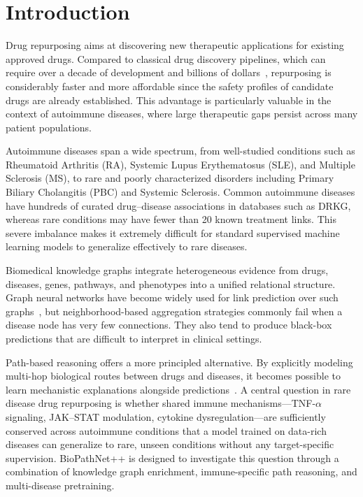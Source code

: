 \documentclass[conference]{IEEEtran}
\begin{document}
\section{Introduction}

Drug repurposing aims at discovering new therapeutic applications for existing approved drugs. Compared to classical drug discovery pipelines, which can require over a decade of development and billions of dollars~\cite{drkg}, repurposing is considerably faster and more affordable since the safety profiles of candidate drugs are already established. This advantage is particularly valuable in the context of autoimmune diseases, where large therapeutic gaps persist across many patient populations.

Autoimmune diseases span a wide spectrum, from well-studied conditions such as Rheumatoid Arthritis (RA), Systemic Lupus Erythematosus (SLE), and Multiple Sclerosis (MS), to rare and poorly characterized disorders including Primary Biliary Cholangitis (PBC) and Systemic Sclerosis. Common autoimmune diseases have hundreds of curated drug--disease associations in databases such as DRKG, whereas rare conditions may have fewer than 20 known treatment links. This severe imbalance makes it extremely difficult for standard supervised machine learning models to generalize effectively to rare diseases.

Biomedical knowledge graphs integrate heterogeneous evidence from drugs, diseases, genes, pathways, and phenotypes into a unified relational structure. Graph neural networks have become widely used for link prediction over such graphs~\cite{distmult}, but neighborhood-based aggregation strategies commonly fail when a disease node has very few connections. They also tend to produce black-box predictions that are difficult to interpret in clinical settings.

Path-based reasoning offers a more principled alternative. By explicitly modeling multi-hop biological routes between drugs and diseases, it becomes possible to learn mechanistic explanations alongside predictions~\cite{nbfnet}. A central question in rare disease drug repurposing is whether shared immune mechanisms---TNF-$\alpha$ signaling, JAK--STAT modulation, cytokine dysregulation---are sufficiently conserved across autoimmune conditions that a model trained on data-rich diseases can generalize to rare, unseen conditions without any target-specific supervision. BioPathNet++ is designed to investigate this question through a combination of knowledge graph enrichment, immune-specific path reasoning, and multi-disease pretraining.
\end{document}
